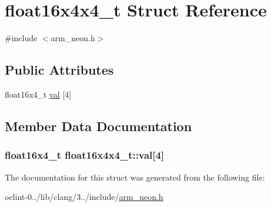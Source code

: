 \hypertarget{structfloat16x4x4__t}{\section{float16x4x4\-\_\-t Struct Reference}
\label{structfloat16x4x4__t}
}


{\ttfamily \#include $<$arm\-\_\-neon.\-h$>$}

\subsection*{Public Attributes}
\begin{DoxyCompactItemize}
\item 
float16x4\-\_\-t \hyperlink{structfloat16x4x4__t_a31689b3828f6e834d49f8134bf1b09f6}{val} \mbox{[}4\mbox{]}
\end{DoxyCompactItemize}


\subsection{Member Data Documentation}
\hypertarget{structfloat16x4x4__t_a31689b3828f6e834d49f8134bf1b09f6}{
\subsubsection[{val}]{\setlength{\rightskip}{0pt plus 5cm}float16x4\-\_\-t float16x4x4\-\_\-t\-::val\mbox{[}4\mbox{]}}}\label{structfloat16x4x4__t_a31689b3828f6e834d49f8134bf1b09f6}


The documentation for this struct was generated from the following file\-:\begin{DoxyCompactItemize}
\item 
oclint-\/0../lib/clang/3../include/\hyperlink{arm__neon_8h}{arm\-\_\-neon.\-h}\end{DoxyCompactItemize}
